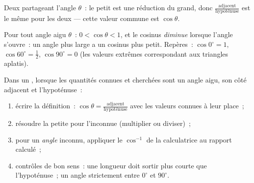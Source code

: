 \begin{omfigure}

{\small Deux  partageant l'angle $\theta$~: le
petit est une réduction du grand, donc
$\frac{\text{adjacent}}{\text{hypoténuse}}$ est le même pour les
deux --- cette valeur commune est $\cos\theta$.}
\end{omfigure}

\begin{proposition}\label{prop:g8:cosine:bounds}
Pour tout angle aigu $\theta$~: $0 < \cos\theta < 1$, et le cosinus
\emph{diminue} lorsque l'angle s'ouvre~: un angle plus large a un
cosinus plus petit. Repères~: $\cos 0^\circ = 1$,
$\cos 60^\circ = \frac12$, $\cos 90^\circ = 0$ (les valeurs extrêmes
correspondant aux triangles aplatis).
\end{proposition}
\admitted

\begin{method}\label{met:g8:cosine:use}
Dans un , lorsque les quantités connues et
cherchées sont un angle aigu, son côté adjacent et l'hypoténuse~:
\begin{enumerate}
  \item écrire la définition~:
        $\cos\theta = \frac{\text{adjacent}}{\text{hypoténuse}}$ avec
        les valeurs connues à leur place~;
  \item résoudre la petite  pour l'inconnue (multiplier ou
        diviser)~;
  \item pour un \emph{angle} inconnu, appliquer le $\cos^{-1}$ de la
        calculatrice au rapport calculé~;
  \item contrôles de bon sens~: une longueur doit sortir plus courte
        que l'hypoténuse~; un angle strictement entre $0^\circ$ et
        $90^\circ$.
\end{enumerate}
\end{method}

